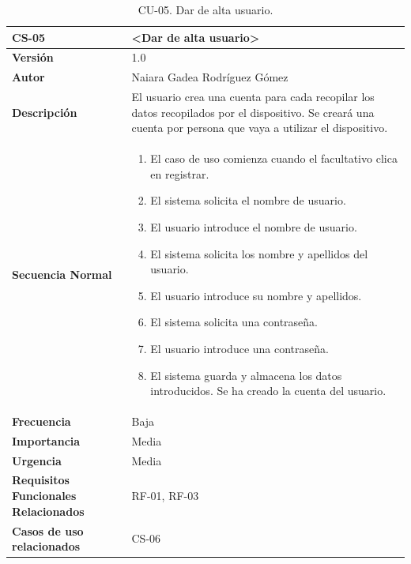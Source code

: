 \begin{table}[h!]
\centering
\begin{tabular}{ |m{3cm}|m{11cm}|  } 
\hline
\cellcolor[HTML]{B9E3F0}\textbf{CS-05} & \cellcolor[HTML]{B9E3F0}\textbf{<Dar de alta usuario>}\\

\hline
\cellcolor[HTML]{EFEFEF}\textbf{Versión}             & 1.0  \\
\hline
\cellcolor[HTML]{EFEFEF}\textbf{Autor}                & Naiara Gadea Rodríguez Gómez\\
\hline
\cellcolor[HTML]{EFEFEF}\textbf{Descripción}                & {El usuario crea una cuenta para cada recopilar los datos recopilados por el dispositivo. Se creará una cuenta por persona que vaya a utilizar el dispositivo.}\\
\hline
\cellcolor[HTML]{EFEFEF}\textbf{Secuencia \newline Normal}                &                 
        \begin{enumerate}
			\def\labelenumi{\arabic{enumi}.}
			\tightlist
			\item El caso de uso comienza cuando el facultativo clica en registrar.
			\item El sistema solicita el nombre de usuario. 
                \item El usuario introduce el nombre de usuario.
                \item El sistema solicita los nombre y apellidos del usuario.
                \item El usuario introduce su nombre y apellidos.
                \item El sistema solicita una contraseña. 
                \item El usuario introduce una contraseña. 
                \item El sistema guarda y almacena los datos introducidos. Se ha creado la cuenta del usuario. 
		\end{enumerate}\\
\hline
\cellcolor[HTML]{EFEFEF}\textbf{Frecuencia}                & Baja\\
\hline
\cellcolor[HTML]{EFEFEF}\textbf{Importancia}                & Media\\
\hline
\cellcolor[HTML]{EFEFEF}\textbf{Urgencia}                & Media\\
\hline
\cellcolor[HTML]{EFEFEF}\textbf{Requisitos Funcionales Relacionados}                & {RF-01, RF-03 }\\
\hline
\cellcolor[HTML]{EFEFEF}\textbf{Casos de uso relacionados}                & {CS-06}\\
\hline
\end{tabular}
\caption{CU-05. Dar de alta usuario.}
\end{table}

